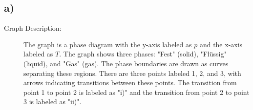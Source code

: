 

\subsection*{a)}

\begin{description}
    \item[Graph Description:] The graph is a phase diagram with the y-axis labeled as $p$ and the x-axis labeled as $T$. The graph shows three phases: "Fest" (solid), "Flüssig" (liquid), and "Gas" (gas). The phase boundaries are drawn as curves separating these regions. There are three points labeled 1, 2, and 3, with arrows indicating transitions between these points. The transition from point 1 to point 2 is labeled as "i)" and the transition from point 2 to point 3 is labeled as "ii)".
\end{description}